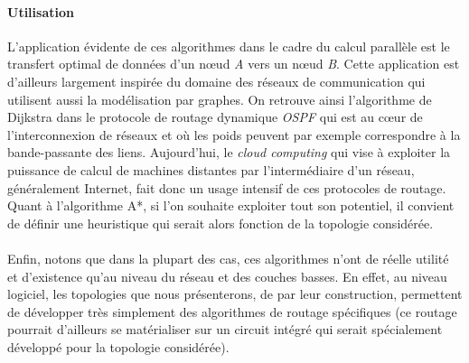 \paragraph{Utilisation} L'application évidente de ces algorithmes dans le cadre du calcul parallèle est le transfert optimal de données d'un nœud \textit{A} vers un nœud \textit{B}. Cette application est d'ailleurs largement inspirée du domaine des réseaux de communication qui utilisent aussi la modélisation par graphes. On retrouve ainsi l'algorithme de Dijkstra dans le protocole de routage dynamique \textit{OSPF} qui est au cœur de l'interconnexion de réseaux et où les poids peuvent par exemple correspondre à la bande-passante des liens. Aujourd'hui, le \textit{cloud computing} qui vise à exploiter la puissance de calcul de machines distantes par l'intermédiaire d'un réseau, généralement Internet, fait donc un usage intensif de ces protocoles de routage. Quant à l'algorithme A*, si l'on souhaite exploiter tout son potentiel, il convient de définir une heuristique qui serait alors fonction de la topologie considérée.

\paragraph{} Enfin, notons que dans la plupart des cas, ces algorithmes n'ont de réelle utilité et d'existence qu'au niveau du réseau et des couches basses. En effet, au niveau logiciel, les topologies que nous présenterons, de par leur construction, permettent de développer très simplement des algorithmes de routage spécifiques (ce routage pourrait d'ailleurs se matérialiser sur un circuit intégré qui serait spécialement développé pour la topologie considérée).